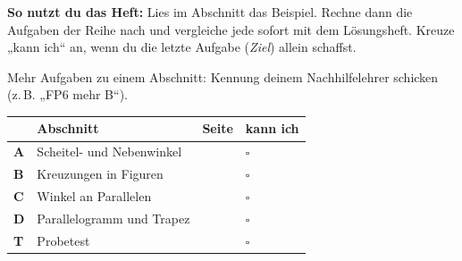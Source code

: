 \documentclass[11pt]{article}
\newlength{\kr}
\begin{document}
\par\smallskip
{}\par\medskip
\noindent\textbf{So nutzt du das Heft:} Lies im Abschnitt das Beispiel. Rechne dann die Aufgaben der Reihe nach und vergleiche jede sofort mit dem Lösungsheft. Kreuze „kann ich“ an, wenn du die letzte Aufgabe (\emph{Ziel}) allein schaffst.\par
\noindent Mehr Aufgaben zu einem Abschnitt: Kennung deinem Nachhilfelehrer schicken (z.\,B. „FP6 mehr B“).\par\medskip
{\renewcommand{\arraystretch}{1.3}
\noindent\begin{tabular}{|>{\bfseries}p{10mm}|p{112mm}|>{\raggedleft\arraybackslash}p{10mm}|>{\centering\arraybackslash}p{14mm}|}\hline
\rowcolor{black!8} & \textbf{Abschnitt} & \textbf{Seite} & \textbf{kann ich}\\\hline
A & Scheitel- und Nebenwinkel & \pageref{s:A} & $\square$\\\hline
B & Kreuzungen in Figuren & \pageref{s:B} & $\square$\\\hline
C & Winkel an Parallelen & \pageref{s:C} & $\square$\\\hline
D & Parallelogramm und Trapez & \pageref{s:D} & $\square$\\\hline
T & Probetest & \pageref{s:T} & $\square$\\\hline
\end{tabular}}\par\bigskip
\end{document}
